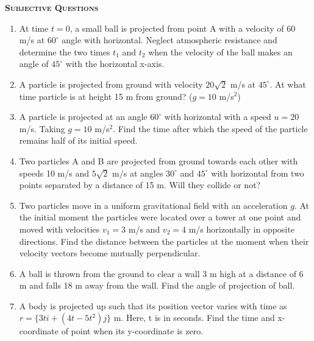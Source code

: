 \documentclass{article}
\begin{document}
\begin{center}
    \textsc{\textbf{Subjective Questions}}
\end{center}


\begin{enumerate}
    \item At time $t = 0$, a small ball is projected from point A with a velocity of 60 m/s at $60^\circ$ angle with horizontal. Neglect atmospheric resistance and determine the two times $t_1$ and $t_2$ when the velocity of the ball makes an angle of $45^\circ$ with the horizontal x-axis.
    \item A particle is projected from ground with velocity $20\sqrt{2}$ m/s at $45^\circ$. At what time particle is at height 15 m from ground? ($g = 10$ m/s$^2$)
    \item A particle is projected at an angle $60^\circ$ with horizontal with a speed $u = 20$ m/s. Taking $g = 10$ m/s$^2$. Find the time after which the speed of the particle remains half of its initial speed.
    \item Two particles A and B are projected from ground towards each other with speeds 10 m/s and $5\sqrt{2}$ m/s at angles $30^\circ$ and $45^\circ$ with horizontal from two points separated by a distance of 15 m. Will they collide or not?
    \begin{center}
    \end{center}

    
    \item Two particles move in a uniform gravitational field with an acceleration $g$. At the initial moment the particles were located over a tower at one point and moved with velocities $v_1 = 3$ m/s and $v_2 = 4$ m/s horizontally in opposite directions. Find the distance between the particles at the moment when their velocity vectors become mutually perpendicular.
    
    \item A ball is thrown from the ground to clear a wall 3 m high at a distance of 6 m and falls 18 m away from the wall. Find the angle of projection of ball.

    \item A body is projected up such that its position vector varies with time as $r = \{3t i + (4t - 5t^2) j\}$ m. Here, t is in seconds. Find the time and x-coordinate of point when its y-coordinate is zero.


\end{enumerate}
\end{document}
